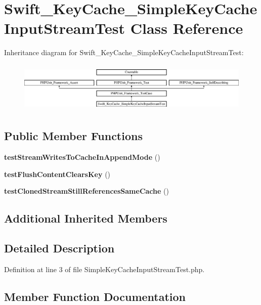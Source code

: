 \section{Swift\+\_\+\+Key\+Cache\+\_\+\+Simple\+Key\+Cache\+Input\+Stream\+Test Class Reference}
\label{class_swift___key_cache___simple_key_cache_input_stream_test}
Inheritance diagram for Swift\+\_\+\+Key\+Cache\+\_\+\+Simple\+Key\+Cache\+Input\+Stream\+Test\+:\begin{figure}[H]
\begin{center}
\leavevmode
\includegraphics[height=2.448087cm]{class_swift___key_cache___simple_key_cache_input_stream_test}
\end{center}
\end{figure}
\subsection*{Public Member Functions}
\begin{DoxyCompactItemize}
\item 
{\bf test\+Stream\+Writes\+To\+Cache\+In\+Append\+Mode} ()
\item 
{\bf test\+Flush\+Content\+Clears\+Key} ()
\item 
{\bf test\+Cloned\+Stream\+Still\+References\+Same\+Cache} ()
\end{DoxyCompactItemize}
\subsection*{Additional Inherited Members}


\subsection{Detailed Description}


Definition at line 3 of file Simple\+Key\+Cache\+Input\+Stream\+Test.\+php.



\subsection{Member Function Documentation}
